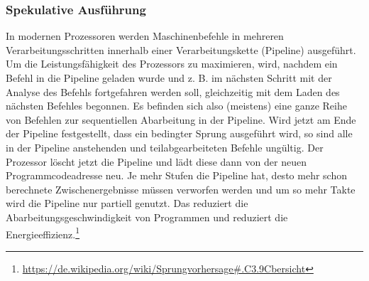 \subsubsection{Spekulative Ausführung}
In modernen Prozessoren werden Maschinenbefehle in mehreren Verarbeitungsschritten innerhalb einer Verarbeitungskette (Pipeline) ausgeführt. Um die Leistungsfähigkeit des Prozessors zu maximieren, wird, nachdem ein Befehl in die Pipeline geladen wurde und z. B. im nächsten Schritt mit der Analyse des Befehls fortgefahren werden soll, gleichzeitig mit dem Laden des nächsten Befehles begonnen. Es befinden sich also (meistens) eine ganze Reihe von Befehlen zur sequentiellen Abarbeitung in der Pipeline. Wird jetzt am Ende der Pipeline festgestellt, dass ein bedingter Sprung ausgeführt wird, so sind alle in der Pipeline anstehenden und teilabgearbeiteten Befehle ungültig. Der Prozessor löscht jetzt die Pipeline und lädt diese dann von der neuen Programmcodeadresse neu. Je mehr Stufen die Pipeline hat, desto mehr schon berechnete Zwischenergebnisse müssen verworfen werden und um so mehr Takte wird die Pipeline nur partiell genutzt. Das reduziert die Abarbeitungsgeschwindigkeit von Programmen und reduziert die Energieeffizienz.\footnote{\url{https://de.wikipedia.org/wiki/Sprungvorhersage\#.C3.9Cbersicht}}

